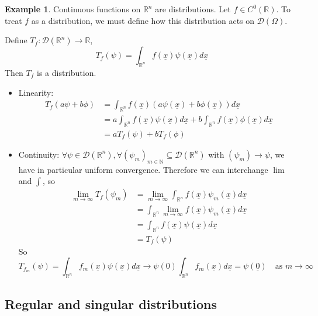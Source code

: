 \documentclass[12pt,a4paper]{article}
\theoremstyle{definition}
\newtheorem{example}[definition]{Example}
\begin{document}
\begin{example}
	Continuous functions on $\mathbb{R}^n$ are distributions. Let $f \in C^{0} (\mathbb{R})$. To treat $f$ as a distribution, we must define how this distribution acts on $\mathcal{D}(\Omega)$.
	
	Define $T_f: \mathcal{D}(\mathbb{R}^n) \rightarrow \mathbb{R}$,
	\[
		T_f (\psi) = \int_{\mathbb{R}^n} f(\underline{x}) \psi(\underline{x}) d \underline{x}
	\]
	Then $T_f$ is a distribution.
	\begin{itemize}
		\item Linearity:
		\[
			\begin{aligned}
				T_f (a \psi + b \phi)
					& = \int_{\mathbb{R}^n} f(\underline{x}) (a \psi(\underline{x}) + b \phi (\underline{x})) d \underline{x} \\
					& = a \int_{\mathbb{R}^n} f(\underline{x}) \psi(\underline{x}) d \underline{x} + b \int_{\mathbb{R}^n} f(\underline{x}) \phi(\underline{x}) d \underline{x} \\
					& = a T_f(\psi) + b T_f (\phi)
			\end{aligned}
		\]
		\item Continuity: $\forall \psi \in \mathcal{D}(\mathbb{R}^n), \forall {(\psi_m)}_{m \in \mathbb{N}} \subseteq \mathcal{D}(\mathbb{R}^n)$ with $(\psi_m) \rightarrow \psi$, we have in particular uniform convergence. Therefore we can interchange $\lim$ and $\int$, so
		\[
			\begin{aligned}
			\lim_{m \rightarrow \infty} T_f (\psi_m)
				& = \lim_{m \rightarrow \infty} \int_{\mathbb{R}^n} f(\underline{x}) \psi_m(\underline{x}) d\underline{x} \\
				& = \int_{\mathbb{R}^n} \lim_{m \rightarrow \infty} f(\underline{x}) \psi_m(\underline{x}) d\underline{x} \\
				& = \int_{\mathbb{R}^n} f(\underline{x}) \psi(\underline{x}) d\underline{x} \\
				& = T_f(\psi)
			\end{aligned}
		\]
		So
		\[
			T_{f_m} (\psi) = \int_{\mathbb{R}^n} f_m(\underline{x}) \psi(\underline{x}) d\underline{x} \rightarrow \psi(0) \int_{\mathbb{R}^n} f_m(\underline{x}) d\underline{x} = \psi(\underline{0}) \quad \text{as } m \rightarrow \infty
		\]
	\end{itemize}
\end{example}

\subsection{Regular and singular distributions}
\end{document}
